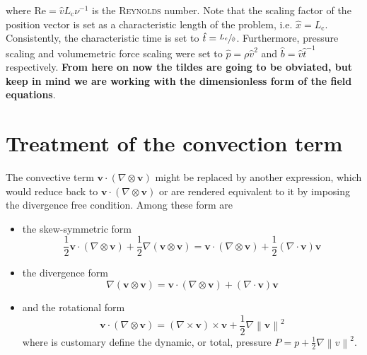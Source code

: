 \documentclass[]{scrartcl}
\newcommand{\bs}[1]{\boldsymbol{#1}}
\newcommand{\norm}[1]{\left\lVert #1 \right\rVert}
\begin{document}
where $\mathrm{Re} = \hat{v}L_\textrm{c}\nu^{-1}$ is the \textsc{Reynolds} number. Note that the scaling factor of the position vector is set as a characteristic length of the problem, i.e. $\hat{x} = L_\textrm{c}$. Consistently, the characteristic time is set to $\hat{t} = \sfrac{L_\textrm{c}}{\hat{v}}$. Furthermore, pressure scaling and volumemetric force scaling were set to $\hat{p} = \rho \hat{v}^2$ and $\hat{b} = \hat{v}\hat{t}^{-1}$ respectively. \textbf{From here on now the tildes are going to be obviated, but keep in mind we are working with the dimensionless form of the field equations}.\\

\section{Treatment of the convection term}
The convective term $\bs{v} \cdot (\nabla \otimes \bs{v})$ might be replaced by another expression, which would reduce back to  $\bs{v} \cdot (\nabla \otimes \bs{v})$ or are rendered equivalent to it  by imposing the divergence free condition. Among these form are
\begin{itemize}
	\item the skew-symmetric form
	\begin{equation}
		\label{Eqn:SkewSymmetricForm}
		\frac{1}{2}\bs{v} \cdot (\nabla \otimes \bs{v}) + \dfrac{1}{2} 	\nabla \left( \bs{v} \otimes \bs{v}\right) = \bs{v} \cdot (\nabla \otimes \bs{v}) + \dfrac{1}{2}(\nabla \cdot \bs{v})\bs{v}
	\end{equation}
	\item the divergence form
	\begin{equation}
		\label{Eqn:DivergenceForm}
		\nabla \left( \bs{v} \otimes \bs{v}\right) = \bs{v} \cdot (\nabla \otimes \bs{v}) + (\nabla \cdot \bs{v})\bs{v}
	\end{equation}
	\item and the rotational form
	\begin{equation}
		\label{Eqn:RotationalForm}
		\bs{v} \cdot (\nabla \otimes \bs{v}) = (\nabla \times \bs{v}) \times \bs{v} + \dfrac{1}{2} \nabla \norm{\bs{v}}^2
	\end{equation}
	where is customary define the dynamic, or total, pressure $P = p +  \tfrac{1}{2} \nabla \norm{v}^2$.
\end{itemize}
\end{document}
